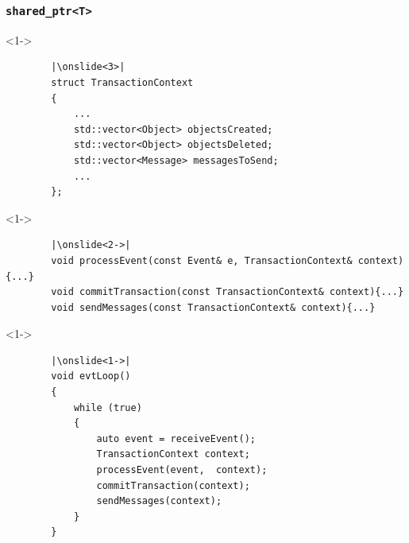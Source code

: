 \documentclass{beamer}
\begin{document}
\begin{frame}
\frametitle{\texttt{shared\_ptr<T>}}
\end{frame}

\begin{frame}[fragile]
	\begin{onlyenv}<1->
	\begin{lstlisting}
		|\onslide<3>|
		struct TransactionContext
		{
			...
			std::vector<Object> objectsCreated;
			std::vector<Object> objectsDeleted;
			std::vector<Message> messagesToSend;
			...
		};
	\end{lstlisting}
	\end{onlyenv}
	\begin{onlyenv}<1->
	\begin{lstlisting}
		|\onslide<2->|
		void processEvent(const Event& e, TransactionContext& context){...}
		void commitTransaction(const TransactionContext& context){...}
		void sendMessages(const TransactionContext& context){...}
	\end{lstlisting}
	\end{onlyenv}
	\begin{onlyenv}<1->
	\begin{lstlisting}
		|\onslide<1->|
		void evtLoop()
		{
			while (true)
			{ 
				auto event = receiveEvent();
				TransactionContext context;
				processEvent(event,  context);
				commitTransaction(context);
				sendMessages(context);
			}
		}
	\end{lstlisting}
	\end{onlyenv}
\end{frame}
\end{document}
